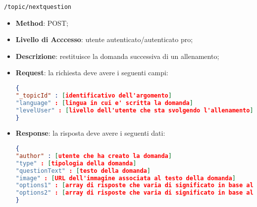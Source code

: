 \item \texttt{/topic/nextquestion}
		\begin{itemize}
			\item \textbf{Method}: POST;
			\item \textbf{Livello di Acccesso}: utente autenticato/autenticato pro;
			\item \textbf{Descrizione}: restituisce la domanda successiva di un allenamento;
			\item \textbf{Request}: la richiesta deve avere i seguenti campi:
\begin{lstlisting}[language=json,firstnumber=1]
{
"_topicId" : [identificativo dell'argomento]
"language" : [lingua in cui e' scritta la domanda]
"levelUser" : [livello dell'utente che sta svolgendo l'allenamento]
}
\end{lstlisting}
			\item \textbf{Response}: la risposta deve avere i seguenti dati:
\begin{lstlisting}[language=json,firstnumber=1]
{
"author" : [utente che ha creato la domanda]
"type" : [tipologia della domanda]
"questionText" : [testo della domanda]
"image" : [URL dell'immagine associata al testo della domanda]
"options1" : [array di risposte che varia di significato in base alla tipologia della domanda]
"options2" : [array di risposte che varia di significato in base alla tipologia della domanda]
}
\end{lstlisting}
		\end{itemize}